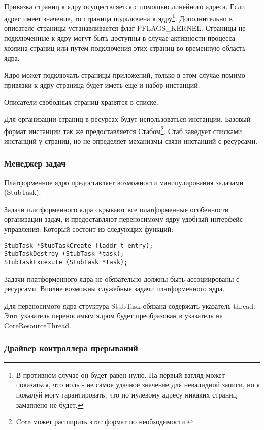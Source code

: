Привязка страниц к ядру осуществляется с помощью линейного адреса. Если адрес
имеет значение, то страница подключена к ядру\footnote{В противном случае он
будет равен нулю. На первый взгляд может показаться, что ноль - не самое удачное
значение для невалидной записи, но я пожалуй могу гарантировать, что по нулевому
адресу никаких страниц замаплено не будет.}. Дополнительно в описателе страницы
устанавливается флаг PFLAGS\_KERNEL. Страницы не подключенные к ядру могут быть
доступны в случае активности процесса - хозяина страниц или путем подключения
этих страниц во временную область ядра.

Ядро может подключать страницы приложений, только в этом случае помимо привязки
к ядру страница будет иметь еще и набор инстанций.

Описатели свободных страниц хранятся в списке.

Для организации страниц в ресурсах будут использоваться инстанции. Базовый
формат инстанции так же предоставляется Стабом\footnote{Core может расширить
этот формат по необходимости.}. Стаб заведует списками инстанций у страниц, но
не определяет механизмы связи инстанций с ресурсами.

\subsubsection{Менеджер задач}

Платформенное ядро предоставляет возможности манипулирования задачами (StubTask).

Задачи платформенного ядра скрывают все платформенные особенности организации
задач, и предоставляют переносимому ядру удобный интерфейс управления. Который
состоит из следующих функций:

\begin{verbatim}
StubTask *StubTaskCreate (laddr_t entry);
StubTaskDestroy (StubTask *task);
StubTaskExcexute (StubTask *task);
\end{verbatim}

Задачи платформенного ядра не обязательно должны быть ассоциированы с ресурсами.
Вполне возможны служебные задачи платформенного ядра.

Для переносимого ядра структура StubTask обязана содержать указатель thread.
Этот указатель переносимым ядром будет преобразован в указатель на CoreResourceThread.

\subsubsection{Драйвер контроллера прерываний}

